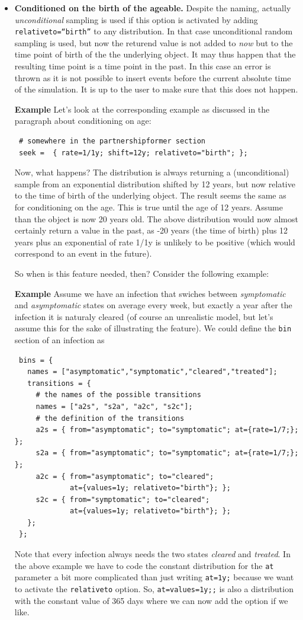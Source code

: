 \documentclass[11pt]{article}
\newenvironment{example}{\par\smallskip\noindent\begingroup\small\textbf{\small Example\enskip}}{\endgroup\par\smallskip}
\begin{document}
\begin{itemize}
\item\textbf{Conditioned on the birth of the ageable.} Despite the naming,
actually \emph{unconditional} sampling is used if this option is activated by
adding \texttt{relativeto=``birth''} to any distribution. In that case
unconditional random sampling is used, but now the returend value is not added
to \emph{now} but to the time point of birth of the the underlying object. It
may thus happen that the resulting time point is a time point in the past. In
this case an error is thrown as it is not possible to insert events before the
current absolute time of the simulation. It is up to the user to make sure that
this does not happen.
\begin{example}
Let's look at the corresponding example as discussed in the paragraph about
conditioning on age:
\begin{verbatim}
 # somewhere in the partnershipformer section
 seek =  { rate=1/1y; shift=12y; relativeto="birth"; };
\end{verbatim}
Now, what happens? The distribution is always returning a (unconditional) sample
from an exponential distribution shifted by 12 years, but now relative to the
time of birth of the underlying object. The result seems the same as for
conditioning on the age. This is true until the age of 12 years. Assume than
the object is now 20 years old. The above distribution would now almost
certainly return a value in the past, as -20 years (the time of birth) plus 12
years plus an exponential of rate 1/1y is unlikely to be positive (which would
correspond to an event in the future).
\end{example}
So when is this feature needed, then? Consider the following example:
\begin{example} Assume
we have an infection that swiches between \emph{symptomatic} and
\emph{asymptomatic} states on average every week, but exactly a year after the
infection it is naturaly cleared (of course an unrealistic model, but let's
assume this for the sake of illustrating the feature). We could define the
\texttt{bin} section of an infection as
\begin{verbatim}
 bins = {
   names = ["asymptomatic","symptomatic","cleared","treated"];
   transitions = {
     # the names of the possible transitions
     names = ["a2s", "s2a", "a2c", "s2c"];
     # the definition of the transitions
     a2s = { from="asymptomatic"; to="symptomatic"; at={rate=1/7;}; };
     s2a = { from="asymptomatic"; to="symptomatic"; at={rate=1/7;}; };
     a2c = { from="asymptomatic"; to="cleared"; 
             at={values=1y; relativeto="birth"}; }; 
     s2c = { from="symptomatic"; to="cleared"; 
             at={values=1y; relativeto="birth"}; }; 
   };
 };
\end{verbatim}
Note that every infection always needs the two states \emph{cleared}
and \emph{treated}. In the above example we have to code the constant
distribution for the \texttt{at} parameter a bit more complicated than just
writing \texttt{at=1y;} because we want to activate the \texttt{relativeto}
option. So, \texttt{at=values=1y;;} is also a
distribution with the constant value of 365 days where we can now add the
option if we like.


\end{example}
\end{itemize}
\end{document}
